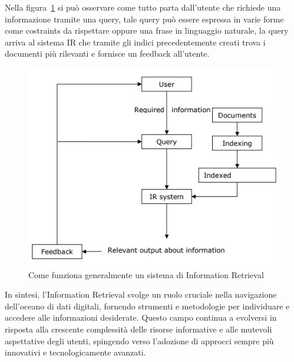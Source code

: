 Nella figura~\ref{fig:comefunzir} si può osservare come tutto parta dall'utente che richiede una informazione tramite una query, tale query può essere espressa in varie forme come costraints da rispettare oppure una frase in linguaggio naturale, la query arriva al sistema IR che tramite gli indici precedentemente creati trova i documenti più rilevanti e fornisce un feedback all'utente. 
\begin{figure}[H]
    \includegraphics{images/comefunzionair.jpg}
    \caption{Come funziona generalmente un sistema di Information Retrieval}
    \label{fig:comefunzir}
\end{figure}

In sintesi, l'Information Retrieval svolge un ruolo cruciale nella navigazione dell'oceano di dati digitali, fornendo strumenti e metodologie per individuare e accedere alle informazioni desiderate. Questo campo continua a evolversi in risposta alla crescente complessità delle risorse informative e alle mutevoli aspettative degli utenti, spingendo verso l'adozione di approcci sempre più innovativi e tecnologicamente avanzati.
